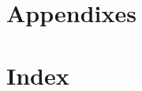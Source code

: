 \documentclass[letterpaper,10pt,titlepage, onecolumn, compsoc]{IEEEtran}
\begin{document}



\section{Appendixes}

\section{Index}
\newpage
\tableofcontents
\end{document}
